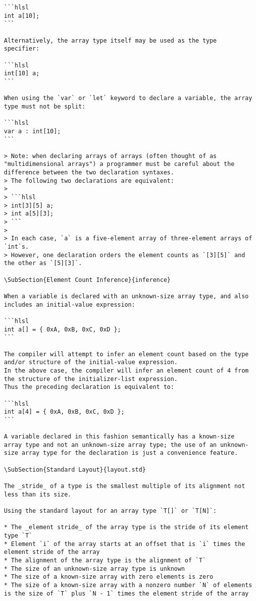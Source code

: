 \begin{verbatim}
```hlsl
int a[10];
```

Alternatively, the array type itself may be used as the type specifier:

```hlsl
int[10] a;
```

When using the `var` or `let` keyword to declare a variable, the array type must not be split:

```hlsl
var a : int[10];
```

> Note: when declaring arrays of arrays (often thought of as "multidimensional arrays") a programmer must be careful about the difference between the two declaration syntaxes.
> The following two declarations are equivalent:
>
> ```hlsl
> int[3][5] a;
> int a[5][3];
> ```
>
> In each case, `a` is a five-element array of three-element arrays of `int`s.
> However, one declaration orders the element counts as `[3][5]` and the other as `[5][3]`.

\SubSection{Element Count Inference}{inference}

When a variable is declared with an unknown-size array type, and also includes an initial-value expression:

```hlsl
int a[] = { 0xA, 0xB, 0xC, 0xD };
```

The compiler will attempt to infer an element count based on the type and/or structure of the initial-value expression.
In the above case, the compiler will infer an element count of 4 from the structure of the initializer-list expression.
Thus the preceding declaration is equivalent to:

```hlsl
int a[4] = { 0xA, 0xB, 0xC, 0xD };
```

A variable declared in this fashion semantically has a known-size array type and not an unknown-size array type; the use of an unknown-size array type for the declaration is just a convenience feature.

\SubSection{Standard Layout}{layout.std}

The _stride_ of a type is the smallest multiple of its alignment not less than its size.

Using the standard layout for an array type `T[]` or `T[N]`:

* The _element stride_ of the array type is the stride of its element type `T`
* Element `i` of the array starts at an offset that is `i` times the element stride of the array
* The alignment of the array type is the alignment of `T`
* The size of an unknown-size array type is unknown
* The size of a known-size array with zero elements is zero
* The size of a known-size array with a nonzero number `N` of elements is the size of `T` plus `N - 1` times the element stride of the array


\end{verbatim}
